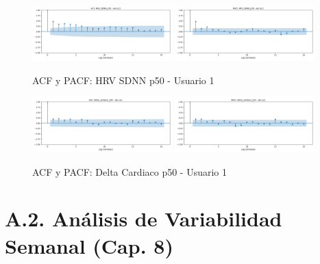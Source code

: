 \documentclass[12pt,letterpaper,twoside]{report}
\begin{document}
\begin{figure}[H]
\centering
\includegraphics[width=0.48\textwidth]{figuras/acf_HRV_SDNN_p50_u1.png}
\includegraphics[width=0.48\textwidth]{figuras/pacf_HRV_SDNN_p50_u1.png}
\caption{ACF y PACF: HRV SDNN p50 - Usuario 1}
\end{figure}

\begin{figure}[H]
\centering
\includegraphics[width=0.48\textwidth]{figuras/acf_Delta_cardiaco_p50_u1.png}
\includegraphics[width=0.48\textwidth]{figuras/pacf_Delta_cardiaco_p50_u1.png}
\caption{ACF y PACF: Delta Cardiaco p50 - Usuario 1}
\end{figure}

\clearpage

\section*{A.2. Análisis de Variabilidad Semanal (Cap. 8)}
\end{document}
